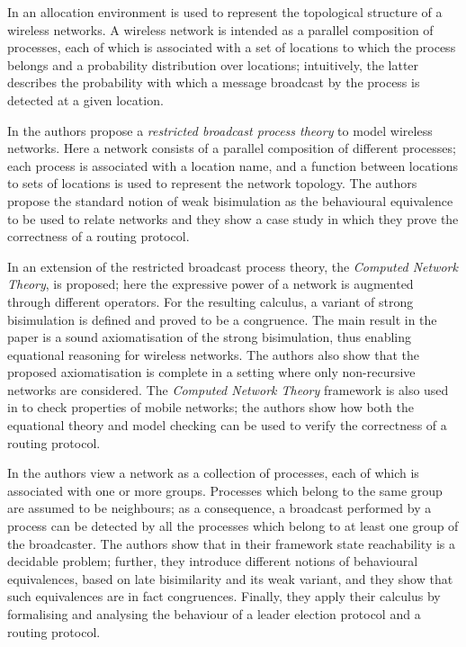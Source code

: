 \documentclass{LMCS}
\begin{document}
In \cite{nanz} an allocation environment is used to represent the 
topological structure of a wireless networks. A wireless network 
is intended as a parallel composition of processes, each of which 
is associated with a set of locations to which the process belongs 
and a probability distribution 
over locations; intuitively, the latter describes the probability 
with which a message broadcast by the process is detected at a 
given location.

In \cite{restrbroad} the authors propose a \emph{restricted 
broadcast process theory} to model wireless networks. 
Here a network consists of a parallel composition 
of different processes; each process is associated with a location name, 
and a function between locations to sets of locations 
is used to represent the network topology. The authors 
propose the standard notion of weak bisimulation as 
the behavioural equivalence to be used to relate networks 
and they show a case study in which they prove the correctness 
of a routing protocol.

In \cite{GwFM10} an extension of the restricted broadcast process theory, 
the \emph{Computed Network Theory}, is proposed; here the expressive power of a network 
is augmented through different operators. 
For the resulting calculus, a variant of strong bisimulation is 
defined and proved to be a congruence. The main result in the paper is a sound 
axiomatisation of the strong bisimulation, thus 
enabling equational reasoning for wireless networks. The authors 
also show that the proposed axiomatisation is complete in a setting 
where only non-recursive networks are considered.
The \emph{Computed Network Theory} framework is also used in 
\cite{wfmodcheck} to check properties of mobile networks; 
the authors show how both the equational theory and model checking 
can be used to verify the correctness of a routing protocol.

In \cite{omegacalc} the authors view a network as a collection of 
processes, each of which is associated with one or more groups. 
Processes which belong to the same group are assumed to be 
neighbours; as a consequence, a broadcast performed by a 
process can be detected by all the processes which belong 
to at least one group of the broadcaster. 
The authors show that in their framework state reachability is 
a decidable problem; further, they introduce different notions 
of behavioural equivalences, based on late bisimilarity and its weak 
variant, and they show that such equivalences are in fact congruences.
Finally, they apply their calculus by formalising and analysing the 
behaviour of a leader election protocol and 
a routing protocol.
\end{document}
